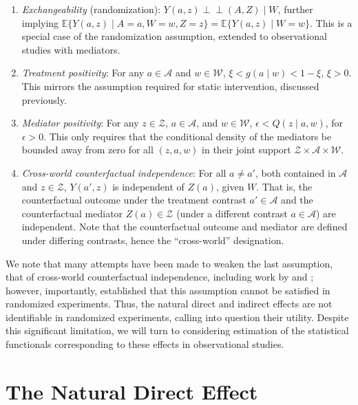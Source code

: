 \documentclass[12pt, krantz2,]{krantz}
\providecommand{\tightlist}{%
  \setlength{\itemsep}{0pt}\setlength{\parskip}{0pt}}
\theoremstyle{definition}
\theoremstyle{definition}
\theoremstyle{definition}
\newcommand{\E}{\mathbb{E}}
\newcommand{\1}{\mathbbm{1}}
\newcommand{\indep}{\mbox{$\perp\!\!\!\perp$}}
\begin{document}
\begin{enumerate}
\def\labelenumi{\arabic{enumi}.}
\tightlist
\item
  \emph{Exchangeability} (randomization): \(Y(a, z) \indep (A, Z) \mid W\), further
  implying \(\E\{Y(a, z) \mid A=a, W=w, Z=z\} = \E\{Y(a, z) \mid W=w\}\). This
  is a special case of the randomization assumption, extended to observational
  studies with mediators.
\item
  \emph{Treatment positivity}: For any \(a \in \mathcal{A}\) and \(w \in \mathcal{W}\), \(\xi < g(a \mid w) < 1 - \xi\), \(\xi > 0\). This mirrors the
  assumption required for static intervention, discussed previously.
\item
  \emph{Mediator positivity}: For any \(z \in \mathcal{Z}\), \(a \in \mathcal{A}\), and
  \(w \in \mathcal{W}\), \(\epsilon < Q(z \mid a, w)\), for \(\epsilon > 0\). This
  only requires that the conditional density of the mediators be bounded away
  from zero for all \((z, a, w)\) in their joint support \(\mathcal{Z} \times \mathcal{A} \times \mathcal{W}\).
\item
  \emph{Cross-world counterfactual independence}: For all \(a \neq a'\), both
  contained in \(\mathcal{A}\) and \(z \in \mathcal{Z}\), \(Y(a', z)\) is independent
  of \(Z(a)\), given \(W\). That is, the counterfactual outcome under the treatment
  contrast \(a' \in \mathcal{A}\) and the counterfactual mediator \(Z(a) \in \mathcal{Z}\) (under a different contrast \(a \in \mathcal{A}\)) are
  independent. Note that the counterfactual outcome and mediator are defined
  under differing contrasts, hence the ``cross-world'' designation.
\end{enumerate}

We note that many attempts have been made to weaken the last assumption, that of
cross-world counterfactual independence, including work by
\citet{petersen2006estimation} and \citet{imai2010identification}; however, importantly,
\citet{robins2010alternative} established that this assumption cannot be satisfied in
randomized experiments. Thus, the natural direct and indirect effects are not
identifiable in randomized experiments, calling into question their utility.
Despite this significant limitation, we will turn to considering estimation of
the statistical functionals corresponding to these effects in observational
studies.

\hypertarget{the-natural-direct-effect}{%
\section{The Natural Direct Effect}\label{the-natural-direct-effect}}
\end{document}
